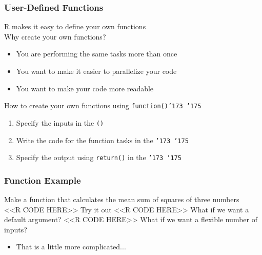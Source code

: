 \documentclass{beamer}
\begin{document}
\begin{frame}\frametitle{User-Defined Functions}
    R makes it easy to define your own functions \\
    \vspace{2ex}
    Why create your own functions?
    \begin{itemize}
        \item You are performing the same tasks more than once
        \item You want to make it easier to parallelize your code
        \item You want to make your code more readable
    \end{itemize}
    \vspace{2ex}
    How to create your own functions using \texttt{function()\char '173 \char '175}
    \begin{enumerate}
        \item Specify the inputs in the \texttt{()}
        \item Write the code for the function tasks in the \texttt{\char '173 \char '175}
        \item Specify the output using \texttt{return()} in the \texttt{\char '173 \char '175}
    \end{enumerate}
\end{frame}

\begin{frame}[fragile]\frametitle{Function Example}
    Make a function that calculates the mean sum of squares of three numbers \\
    <<R CODE HERE>>
    \vspace{1ex}
    Try it out
    <<R CODE HERE>>
    \vspace{1ex}
    What if we want a default argument?
    <<R CODE HERE>>
    \vspace{1ex}
    What if we want a flexible number of inputs?
    \begin{itemize}
        \item That is a little more complicated...
    \end{itemize}
\end{frame}
\end{document}
